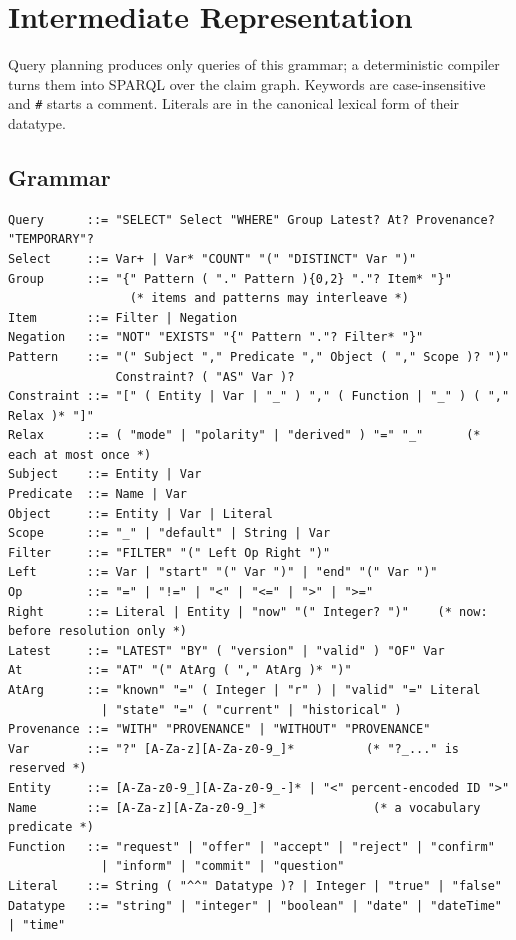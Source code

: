 \section{Intermediate Representation}\label{sec:s-grammar}

Query planning produces only queries of this grammar; a deterministic compiler turns them into
SPARQL over the claim graph. Keywords are case-insensitive and \texttt{\#} starts a comment.
Literals are in the canonical lexical form of their datatype.

\subsection{Grammar}

{\scriptsize
\begin{verbatim}
Query      ::= "SELECT" Select "WHERE" Group Latest? At? Provenance? "TEMPORARY"?
Select     ::= Var+ | Var* "COUNT" "(" "DISTINCT" Var ")"
Group      ::= "{" Pattern ( "." Pattern ){0,2} "."? Item* "}"
                 (* items and patterns may interleave *)
Item       ::= Filter | Negation
Negation   ::= "NOT" "EXISTS" "{" Pattern "."? Filter* "}"
Pattern    ::= "(" Subject "," Predicate "," Object ( "," Scope )? ")"
               Constraint? ( "AS" Var )?
Constraint ::= "[" ( Entity | Var | "_" ) "," ( Function | "_" ) ( "," Relax )* "]"
Relax      ::= ( "mode" | "polarity" | "derived" ) "=" "_"      (* each at most once *)
Subject    ::= Entity | Var
Predicate  ::= Name | Var
Object     ::= Entity | Var | Literal
Scope      ::= "_" | "default" | String | Var
Filter     ::= "FILTER" "(" Left Op Right ")"
Left       ::= Var | "start" "(" Var ")" | "end" "(" Var ")"
Op         ::= "=" | "!=" | "<" | "<=" | ">" | ">="
Right      ::= Literal | Entity | "now" "(" Integer? ")"    (* now: before resolution only *)
Latest     ::= "LATEST" "BY" ( "version" | "valid" ) "OF" Var
At         ::= "AT" "(" AtArg ( "," AtArg )* ")"
AtArg      ::= "known" "=" ( Integer | "r" ) | "valid" "=" Literal
             | "state" "=" ( "current" | "historical" )
Provenance ::= "WITH" "PROVENANCE" | "WITHOUT" "PROVENANCE"
Var        ::= "?" [A-Za-z][A-Za-z0-9_]*          (* "?_..." is reserved *)
Entity     ::= [A-Za-z0-9_][A-Za-z0-9_-]* | "<" percent-encoded ID ">"
Name       ::= [A-Za-z][A-Za-z0-9_]*               (* a vocabulary predicate *)
Function   ::= "request" | "offer" | "accept" | "reject" | "confirm"
             | "inform" | "commit" | "question"
Literal    ::= String ( "^^" Datatype )? | Integer | "true" | "false"
Datatype   ::= "string" | "integer" | "boolean" | "date" | "dateTime" | "time"
\end{verbatim}
}

